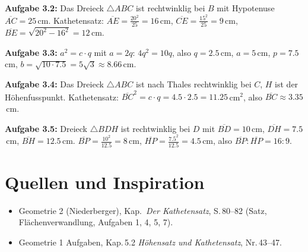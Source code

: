 \documentclass[11pt,oneside]{article}
\begin{document}
\textbf{Aufgabe 3.2:} Das Dreieck $\triangle ABC$ ist rechtwinklig bei $B$ mit Hypotenuse $\overline{AC}=25$\,cm. Kathetensatz: $\overline{AE}=\frac{20^2}{25}=16$\,cm, $\overline{CE}=\frac{15^2}{25}=9$\,cm, $\overline{BE}=\sqrt{20^2-16^2}=12$\,cm.

\textbf{Aufgabe 3.3:} $a^2=c\cdot q$ mit $a=2q$: $4q^2=10q$, also $q=2.5$\,cm, $a=5$\,cm, $p=7.5$\,cm, $b=\sqrt{10\cdot 7.5}=5\sqrt3\approx 8.66$\,cm.

\textbf{Aufgabe 3.4:} Das Dreieck $\triangle ABC$ ist nach Thales rechtwinklig bei $C$, $H$ ist der Höhenfusspunkt. Kathetensatz: $\overline{BC}^2=c\cdot q=4.5\cdot 2.5=11.25$\,cm$^2$, also $\overline{BC}\approx 3.35$\,cm.

\textbf{Aufgabe 3.5:} Dreieck $\triangle BDH$ ist rechtwinklig bei $D$ mit $\overline{BD}=10$\,cm, $\overline{DH}=7.5$\,cm, $\overline{BH}=12.5$\,cm. $\overline{BP}=\frac{10^2}{12.5}=8$\,cm, $\overline{HP}=\frac{7.5^2}{12.5}=4.5$\,cm, also $\overline{BP}:\overline{HP}=16:9$.

\section*{Quellen und Inspiration}
\begin{itemize}[itemsep=0pt]
	\item Geometrie 2 (Niederberger), Kap.\ \textit{Der Kathetensatz}, S.\,80--82 (Satz, Flächenverwandlung, Aufgaben 1, 4, 5, 7).
	\item Geometrie 1 Aufgaben, Kap.\,5.2 \textit{Höhensatz und Kathetensatz}, Nr.\,43--47.
\end{itemize}
\end{document}
